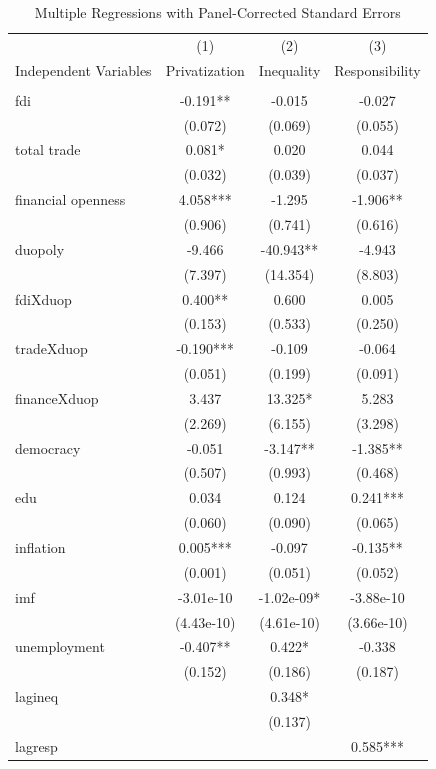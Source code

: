 \documentclass[12pt]{report}
\begin{document}
\begin{center}
\begin{table}
\caption{Multiple Regressions with Panel-Corrected Standard Errors}

{\footnotesize
\begin{tabular}{lccc}\hline
 & (1) & (2) & (3) \\
Independent Variables & Privatization & Inequality & Responsibility \\ \hline
 &  &  &  \\
fdi & -0.191** & -0.015 & -0.027 \\
 & (0.072) & (0.069) & (0.055) \\
total trade & 0.081* & 0.020 & 0.044 \\
 & (0.032) & (0.039) & (0.037) \\
financial openness & 4.058*** & -1.295 & -1.906** \\
 & (0.906) & (0.741) & (0.616) \\
duopoly & -9.466 & -40.943** & -4.943 \\
 & (7.397) & (14.354) & (8.803) \\
fdiXduop & 0.400** & 0.600 & 0.005 \\
 & (0.153) & (0.533) & (0.250) \\
tradeXduop & -0.190*** & -0.109 & -0.064 \\
 & (0.051) & (0.199) & (0.091) \\
financeXduop & 3.437 & 13.325* & 5.283 \\
 & (2.269) & (6.155) & (3.298) \\
democracy & -0.051 & -3.147** & -1.385** \\
 & (0.507) & (0.993) & (0.468) \\
edu & 0.034 & 0.124 & 0.241*** \\
 & (0.060) & (0.090) & (0.065) \\
inflation & 0.005*** & -0.097 & -0.135** \\
 & (0.001) & (0.051) & (0.052) \\
imf & -3.01e-10 & -1.02e-09* & -3.88e-10 \\
 & (4.43e-10) & (4.61e-10) & (3.66e-10) \\
unemployment & -0.407** & 0.422* & -0.338 \\
 & (0.152) & (0.186) & (0.187) \\
lagineq &  & 0.348* &  \\
 &  & (0.137) &  \\
lagresp &  &  & 0.585*** \\

\end{tabular}}
\end{table}
\end{center}
\end{document}
